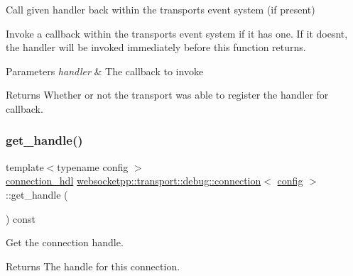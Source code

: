 Call given handler back within the transport\textquotesingle{}s event system (if present) 

Invoke a callback within the transport\textquotesingle{}s event system if it has one. If it doesn\textquotesingle{}t, the handler will be invoked immediately before this function returns.


\begin{DoxyParams}{Parameters}
{\em handler} & The callback to invoke\\
\hline
\end{DoxyParams}
\begin{DoxyReturn}{Returns}
Whether or not the transport was able to register the handler for callback. 
\end{DoxyReturn}
\mbox{\label{classwebsocketpp_1_1transport_1_1debug_1_1connection_a258046ad6f04c2fe9d3b31da345c282f}} 
\subsubsection{\texorpdfstring{get\+\_\+handle()}{get\_handle()}}
{\footnotesize\ttfamily template$<$typename config $>$ \\
\mbox{\hyperlink{namespacewebsocketpp_a6b3d26a10ee7229b84b776786332631d}{connection\+\_\+hdl}} \mbox{\hyperlink{classwebsocketpp_1_1transport_1_1debug_1_1connection}{websocketpp\+::transport\+::debug\+::connection}}$<$ \mbox{\hyperlink{classconfig}{config}} $>$\+::get\+\_\+handle (\begin{DoxyParamCaption}{ }\end{DoxyParamCaption}) const\hspace{0.3cm}{\ttfamily [inline]}}



Get the connection handle. 

\begin{DoxyReturn}{Returns}
The handle for this connection. 
\end{DoxyReturn}
\mbox{\label{classwebsocketpp_1_1transport_1_1debug_1_1connection_a8e32def2e7de74a13684571cccce494b}} 
